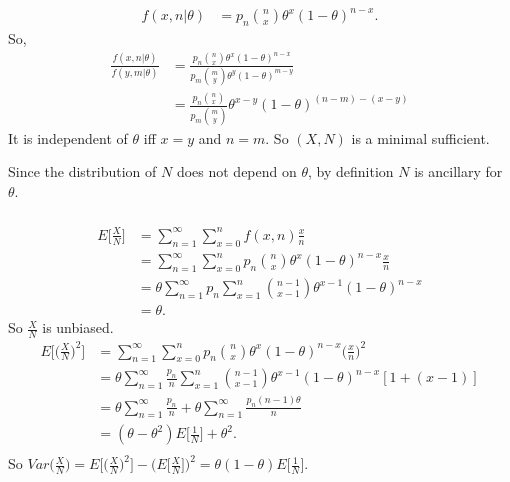 \subsubsection{} %

\begin{align}
    f(x,n|\theta)
        &= p_n \binom{n}{x} \theta^x(1-\theta)^{n-x}.
\end{align}
So,
\begin{align}
    \frac{f(x,n|\theta)}{f(y, m|\theta)}
    &= \frac{ p_n \binom{n}{x} \theta^x(1-\theta)^{n-x}}
        {p_m \binom{m}{y} \theta^y(1-\theta)^{m-y}} \\
    &= \frac{ p_n \binom{n}{x}} {p_m \binom{m}{y}}
        \theta^{x-y}(1-\theta)^{(n-m)-(x-y)}
\end{align}
It is independent of $\theta$ iff $x=y$ and $n=m$.
So $(X, N)$ is a minimal sufficient.

Since the distribution of $N$ does not depend on $\theta$,
by definition $N$ is ancillary for $\theta$.

\subsubsection{} %

\begin{align}
    E\bigg[\frac{X}{N}\bigg]
        &= \sum_{n=1}^\infty \sum_{x=0}^n f(x,n) \frac{x}{n} \\
        &= \sum_{n=1}^\infty \sum_{x=0}^n p_n \binom{n}{x} \theta^x(1-\theta)^{n-x} \frac{x}{n} \\
        &= \theta \sum_{n=1}^\infty p_n \sum_{x=1}^n \binom{n-1}{x-1} \theta^{x-1}(1-\theta)^{n-x} \\
        &= \theta.
\end{align}
So $\frac{X}{N}$ is unbiased.
\begin{align}
    E\bigg[\bigg(\frac{X}{N}\bigg)^2\bigg]
        &= \sum_{n=1}^\infty \sum_{x=0}^n p_n \binom{n}{x} \theta^x(1-\theta)^{n-x} \bigg(\frac{x}{n}\bigg)^2 \\
        &= \theta \sum_{n=1}^\infty \frac{p_n}{n} \sum_{x=1}^n \binom{n-1}{x-1} \theta^{x-1}(1-\theta)^{n-x}[1+(x-1)] \\
        &= \theta \sum_{n=1}^\infty \frac{p_n}{n}
            + \theta \sum_{n=1}^\infty\frac{p_n(n-1)\theta}{n} \\
        &= (\theta - \theta^2) E\bigg[\frac{1}{N}\bigg] + \theta^2. \\
\end{align}
So $Var\big(\frac{X}{N}\big) = E\big[\big(\frac{X}{N}\big)^2\big] - \big(E\big[\frac{X}{N}\big]\big)^2=\theta(1-\theta)E\big[\frac{1}{N}\big]$.

